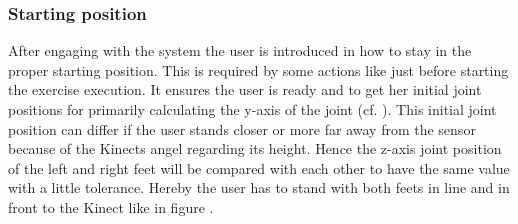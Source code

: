 \subsubsection{Starting position}\label{5_2_1_startingPosition}
After engaging with the system the user  is introduced in how to stay in the proper starting position. This is required by some actions like just before starting the exercise execution. It ensures the user is ready and to get her initial joint positions for primarily calculating the y-axis of the joint (cf. ). This initial joint position can differ if the user stands closer or more far away from the sensor because of the Kinects angel regarding its height. Hence the z-axis joint position of the left and right feet will be compared with each other to have the same value with a little tolerance. Hereby the user has to stand with both feets in line and in front to the Kinect like in figure .


